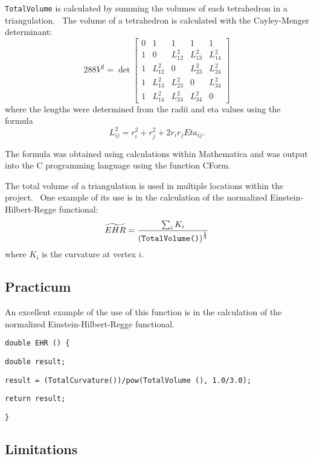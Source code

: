 \texttt{TotalVolume} is calculated by summing the volumes of each
tetrahedron in a triangulation. \ The volume of a tetrahedron is calculated
with the Cayley-Menger determinant:%
\begin{equation*}
288V^{2}=\det \left[ 
\begin{array}{ccccc}
0 & 1 & 1 & 1 & 1 \\ 
1 & 0 & L_{12}^{2} & L_{13}^{2} & L_{14}^{2} \\ 
1 & L_{12}^{2} & 0 & L_{23}^{2} & L_{24}^{2} \\ 
1 & L_{13}^{2} & L_{23}^{2} & 0 & L_{34}^{2} \\ 
1 & L_{14}^{2} & L_{24}^{2} & L_{34}^{2} & 0%
\end{array}%
\right] 
\end{equation*}%
where the lengths were determined from the radii and eta values using the
formula%
\begin{equation*}
L_{ij}^{2}=r_{i}^{2}+r_{j}^{2}+2r_{i}r_{j}Eta_{ij}.
\end{equation*}

The formula was obtained using calculations within Mathematica and was
output into the C programming language using the function CForm. \ 

The total volume of a triangulation is used in multiple locations within the
project. \ One example of its use is in the calculation of the normalized
Einstein-Hilbert-Regge functional:%
\begin{equation*}
\widetilde{EHR}=\frac{\sum_{i}K_{i}}{\left( \text{\texttt{TotalVolume()}}%
\right) ^{\frac{1}{3}}}
\end{equation*}%
where $K_{i}$ is the curvature at vertex $i$.

\subsection*{Practicum}

An excellent example of the use of this function is in the calculation of
the normalized Einstein-Hilbert-Regge functional. \ 

\qquad\texttt{double EHR () \{}

\qquad\qquad\texttt{double result;}

\qquad \qquad \texttt{result = (TotalCurvature())/pow(TotalVolume (),
1.0/3.0);}

\qquad\qquad\texttt{return result;}

\qquad\qquad\texttt{\}}

\subsection*{Limitations}

